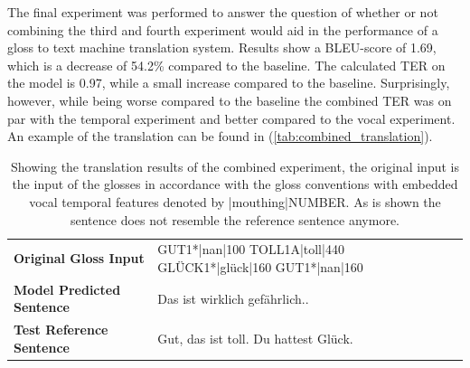 
The final experiment was performed to answer the question of whether or not combining the third and fourth experiment would aid in the performance of a gloss to text machine translation system. Results show a BLEU-score of 1.69, which is a decrease of 54.2\% compared to the baseline. The calculated TER on the model is 0.97, while a small increase compared to the baseline. Surprisingly, however, while being worse compared to the baseline the combined TER was on par with the temporal experiment and better compared to the vocal experiment. An example of the translation can be found in (\autoref{tab:combined_translation}).
\begin{table}[h]
\centering
\caption{Showing the translation results of the combined experiment, the original input is the input of the glosses in accordance with the gloss conventions with embedded vocal temporal features denoted by |mouthing|NUMBER. As is shown the sentence does not resemble the reference sentence anymore.}

\begin{tabular}{ll}
\textbf{Original Gloss Input}     & GUT1*|nan|100 TOLL1A|toll|440 GLÜCK1*|glück|160 GUT1*|nan|160 \\
\textbf{Model Predicted Sentence} & Das ist wirklich gefährlich..                                                                                     \\
\textbf{Test Reference Sentence}  & Gut, das ist toll. Du hattest Glück.                                                

\end{tabular}
\bottomrule
\label{tab:combined_translation}
\end{table}



\mydata

